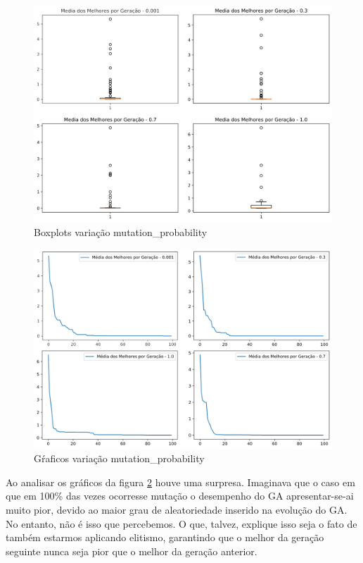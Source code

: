 \documentclass[12pt]{article}
\begin{document}
\begin{figure}[H]
	\centering
	\includegraphics[width=0.9\linewidth]{Imagens/mutacao/boxplotMutacao}
	\caption{Boxplots variação mutation\_probability}
	\label{fig:boxplotmutacao}
\end{figure}
\begin{figure}[H]
	\centering
	\includegraphics[width=0.9\linewidth]{Imagens/mutacao/graficoMutacao}
	\caption{Gŕaficos variação mutation\_probability}
	\label{fig:graficomutacao}
\end{figure}

Ao analisar os gráficos da figura \ref{fig:graficomutacao} houve uma surpresa. Imaginava que o caso em que em 100\% das vezes ocorresse mutação o desempenho do GA apresentar-se-ai muito pior, devido ao maior grau de aleatoriedade inserido na evolução do GA. No entanto, não é isso que percebemos. O que, talvez, explique isso seja o fato de também estarmos aplicando elitismo, garantindo que o melhor da geração seguinte nunca seja pior que o melhor da geração anterior. 
\end{document}
